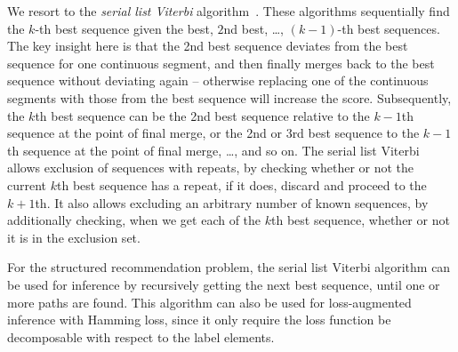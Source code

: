 We resort to the \emph{serial list Viterbi} algorithm~\cite{nilsson2001sequentially}.
These algorithms sequentially find the $k$-th best sequence given the best, $2$nd best, \dots, $(k-1)$-th best sequences.
The key insight here is that the 2nd best sequence deviates from the best sequence
for one continuous segment, and then finally merges back to the best sequence without deviating again
-- otherwise replacing one of the continuous segments with those from the best sequence will increase the score.
Subsequently, the $k$th best sequence can be the 2nd best sequence relative to the $k-1$th sequence
at the point of final merge, or the 2nd or 3rd best sequence to the $k-1$th sequence at the point of final merge, \ldots, and so on.
The serial list Viterbi allows exclusion of sequences with repeats, by checking whether or not the current $k$th best sequence has a repeat, if it does, discard and proceed to the $k+1$th. It also allows excluding an arbitrary number of known sequences, by additionally checking, when we get each of the $k$th best sequence, whether or not it is in the exclusion set.

For the structured recommendation problem, the serial list Viterbi algorithm can be used for inference
by recursively getting the next best sequence, until one or more paths are found.
This algorithm can also be used for loss-augmented inference with Hamming loss,
since it only require the loss function be decomposable with respect to the label elements.

